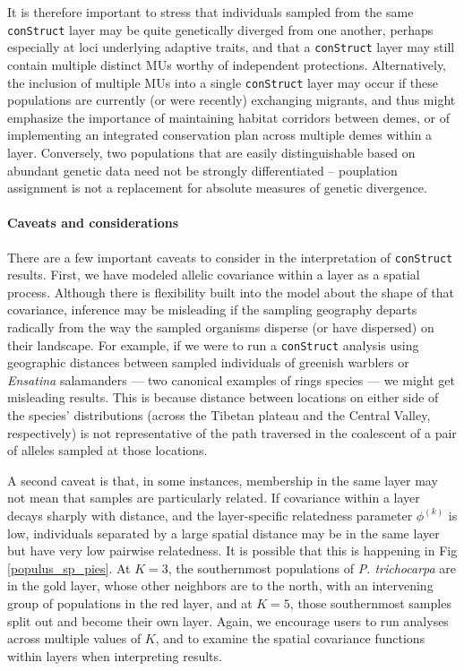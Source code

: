 \documentclass[12pt]{article}
\begin{document}
It is therefore important to stress that individuals sampled from the same \texttt{conStruct} layer 
may be quite genetically diverged from one another, 
perhaps especially at loci underlying adaptive traits, 
and that a \texttt{conStruct} layer may still contain multiple distinct MUs worthy of independent protections.  
Alternatively, the inclusion of multiple MUs into a single \texttt{conStruct} layer 
may occur if these populations are currently 
(or were recently) exchanging migrants, 
and thus might emphasize the importance of maintaining habitat corridors between demes, 
or of implementing an integrated conservation plan across multiple demes within a layer.
Conversely, two populations that are easily distinguishable based on abundant genetic data
need not be strongly differentiated --
pouplation assignment is not a replacement for absolute measures of genetic divergence.

\paragraph{Caveats and considerations}
There are a few important caveats to consider in the interpretation of \texttt{conStruct} results. 
First, we have modeled allelic covariance within a layer as a spatial process.
Although there is flexibility built into the model about the shape of that covariance, 
inference may be misleading if the sampling geography departs radically from the way 
the sampled organisms disperse (or have dispersed) on their landscape.
For example, if we were to run a \texttt{conStruct} analysis using geographic distances between 
sampled individuals of greenish warblers \citep{Irwin2001} or \textit{Ensatina} salamanders \citep{wake_schneider1998} 
--- two canonical examples of rings species --- 
we might get misleading results.
This is because distance between locations on either side of the species' distributions
(across the Tibetan plateau and the Central Valley, respectively) 
is not representative of the path traversed in the coalescent of a pair of alleles sampled at those locations.

A second caveat is that, in some instances, 
membership in the same layer may not mean that samples are particularly related.
If covariance within a layer decays sharply with distance, 
and the layer-specific relatedness parameter $\phi^{(k)}$ is low, 
individuals separated by a large spatial distance may be in the same layer but have very low pairwise relatedness.
It is possible that this is happening in Fig \ref{populus_sp_pies}. 
At $K=3$, the southernmost populations of \textit{P. trichocarpa} are in the gold layer, 
whose other neighbors are to the north, with an intervening group of populations in the red layer, 
and at $K=5$, those southernmost samples split out and become their own layer.
Again, we encourage users to run analyses across multiple values of $K$, 
and to examine the spatial covariance functions within layers when interpreting results.
\end{document}

